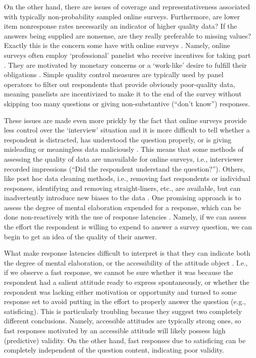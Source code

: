 \documentclass[Royal,times,sageh]{sagej}
\begin{document}
On the other hand, there are issues of coverage and representativeness
associated with typically non-probability sampled online surveys.
Furthermore, are lower item nonresponse rates necessarily an indicator
of higher quality data? If the answers being supplied are nonsense, are
they really preferable to missing values? Exactly this is the concern
some have with online surveys
\citep{Leiner2019, Kaminska2010, Vannette2014}. Namely, online surveys
often employ `professional' panelist who receive incentives for taking
part \citep{Stocke2006}. They are motivated by monetary concerns or a
`work-like' desire to fulfill their obligations \citep{Silber2013}.
Simple quality control measures are typically used by panel operators to
filter out respondents that provide obviously poor-quality data, meaning
panelists are incentivized to make it to the end of the survey without
skipping too many questions or giving non-substantive (``don't know'')
responses.

These issues are made even more prickly by the fact that online surveys
provide less control over the `interview' situation and it is more
difficult to tell whether a respondent is distracted, has understood the
question properly, or is giving misleading or meaningless data
maliciously \citep{Leiner2019}. This means that some methods of
assessing the quality of data are unavailable for online surveys, i.e.,
interviewer recorded impressions (``Did the respondent understand the
question?''). Others, like post hoc data cleaning methods, i.e.,
removing fast respondents or individual responses, identifying and
removing straight-liners, etc., are available, but can inadvertently
introduce new biases to the data \citep{Leiner2019}. One promising
approach is to assess the degree of mental elaboration expended for a
response, which can be done non-reactively with the use of response
latencies \citep[reactive methods may try to directly assess the
respondent's motivation and opportunity by asking directly about
them,][]{Mayerl2008, Stocke2006}. Namely, if we can assess the effort
the respondent is willing to expend to answer a survey question, we can
begin to get an idea of the quality of their answer.

What make response latencies difficult to interpret is that they can
indicate both the degree of mental elaboration, or the accessibility of
the attitude object \citep{Stocke2004c}. I.e., if we observe a fast
response, we cannot be sure whether it was because the respondent had a
salient attitude ready to express spontaneously, or whether the
respondent was lacking either motivation or opportunity and turned to
some response set to avoid putting in the effort to properly answer the
question (e.g., satisficing). This is particularly troubling because
they suggest two completely different conclusions. Namely, accessible
attitudes are typically strong ones, so fast responses motivated by an
accessible attitude will likely possess high (predictive) validity. On
the other hand, fast responses due to satisficing can be completely
independent of the question content, indicating poor validity.
\end{document}
